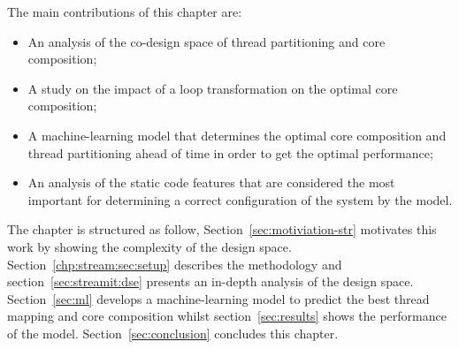 The main contributions of this chapter are:
\vspace{-1em}
\begin{itemize}
\item An analysis of the co-design space of thread partitioning and core composition;
\vspace{-1em}
\item A study on the impact of a loop transformation on the optimal core composition;
\vspace{-2em}
\item A machine-learning model that determines the optimal core composition and thread partitioning ahead of time in order to get the optimal performance;
\vspace{-1em}
\item An analysis of the static code features that are considered the most important for determining a correct configuration of the system by the model.
\end{itemize}


The chapter is structured as follow,
Section~\ref{sec:motiviation-str} motivates this work by showing the complexity of the design space.
Section~\ref{chp:stream:sec:setup} describes the methodology and section~\ref{sec:streamit:dse} presents an in-depth analysis of the design space.
Section~\ref{sec:ml} develops a machine-learning model to predict the best thread mapping and core composition whilst section~\ref{sec:results} shows the performance of the model.
Section~\ref{sec:conclusion} concludes this chapter.



